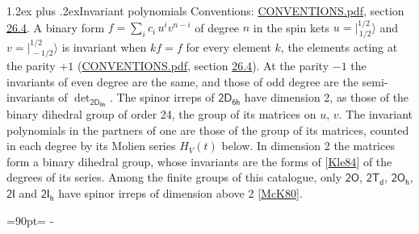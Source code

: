 \documentclass[10pt,a4paper]{article}
\makeatletter
\renewcommand\section{\@startsection{section}{1}{\z@}{-3ex plus -1ex minus -.2ex}%
  {1.2ex plus .2ex}{\normalfont\large\sffamily\bfseries\color{parttitle}}}
\newcommand{\needspace}[1]{\par\penalty-100\begingroup\dimen0=#1\relax\dimen2=\pagegoal
  \advance\dimen2-\pagetotal\ifdim\dimen0>\dimen2\relax\ifdim\dimen2>0pt\vfil\break\fi\fi
  \endgroup}
\numberwithin{equation}{section}
\newcommand{\grp}[1]{\mathsf{#1}}
\newcommand{\jm}[2]{\bigl\lvert{}^{#1}_{\,#2}\bigr\rangle}
\makeatother
\begin{document}
\section{Invariant polynomials}\label{s:invariants}
Conventions: \href{../../CONVENTIONS.pdf}{CONVENTIONS.pdf}, section \href{../../CONVENTIONS.pdf\#conv.26.4}{26.4}.
\leavevmode\label{n:local.binary.form}A binary form $f = \sum_i c_i\, u^i v^{n-i}$ of degree $n$ in the spin kets $u = \jm{1/2}{1/2}$ and $v = \jm{1/2}{-1/2}$ is invariant when $k f = f$ for every element $k$, the elements acting at the parity $+1$ (\href{../../CONVENTIONS.pdf}{CONVENTIONS.pdf}, section \href{../../CONVENTIONS.pdf\#conv.26.4}{26.4}). At the parity $-1$ the invariants of even degree are the same, and those of odd degree are the semi-invariants of $\det_{\grp{2D_{6h}}}$.
The spinor irreps of $\grp{2D_{6h}}$ have dimension 2, as those of the binary dihedral group of order 24, the group of its matrices on $u$, $v$. \label{n:function.hilbert}The invariant polynomials in the partners of one are those of the group of its matrices, counted in each degree by its Molien series $H_V(t)$ below. In dimension 2 the matrices form a binary dihedral group, whose invariants are the forms of [\href{../../../REFERENCES.pdf\#ref.Kle84}{Kle84}] of the degrees of its series. Among the finite groups of this catalogue, only $\grp{2O}$, $\grp{2T_{d}}$, $\grp{2O_{h}}$, $\grp{2I}$ and $\grp{2I_{h}}$ have spinor irreps of dimension above 2 [\href{../../../REFERENCES.pdf\#ref.McK80}{McK80}].
\needspace{90pt}
\end{document}
